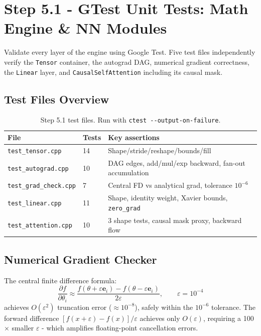 \documentclass[12pt, a4paper]{article}
\begin{document}
\section{Step 5.1 - GTest Unit Tests: Math Engine \& NN Modules}

\begin{tcolorbox}[designbox, title={Step 5.1 Goal}]
  Validate every layer of the engine using Google Test.  Five test files
  independently verify the \texttt{Tensor} container, the autograd DAG,
  numerical gradient correctness, the \texttt{Linear} layer, and
  \texttt{CausalSelfAttention} including its causal mask.
\end{tcolorbox}

\subsection{Test Files Overview}

\begin{table}[!ht]
\centering
\renewcommand{\arraystretch}{1.3}
\begin{tabular}{@{} l l p{10cm} @{}}
\toprule
\textbf{File} & \textbf{Tests} & \textbf{Key assertions} \\
\midrule
\texttt{test\_tensor.cpp}    & 14 & Shape/stride/reshape/bounds/fill \\
\texttt{test\_autograd.cpp}  & 10 & DAG edges, add/mul/exp backward, fan-out accumulation \\
\texttt{test\_grad\_check.cpp} & 7 & Central FD vs analytical grad, tolerance $10^{-6}$ \\
\texttt{test\_linear.cpp}    & 11 & Shape, identity weight, Xavier bounds, \texttt{zero\_grad} \\
\texttt{test\_attention.cpp} & 10 & 3 shape tests, causal mask proxy, backward flow \\
\bottomrule
\end{tabular}
\caption{Step 5.1 test files. Run with \texttt{ctest -{}-output-on-failure}.}
\end{table}

\subsection{Numerical Gradient Checker}

The central finite difference formula:
\[
  \frac{\partial f}{\partial \theta_i}
  \approx \frac{f(\theta + \varepsilon \mathbf{e}_i) - f(\theta - \varepsilon \mathbf{e}_i)}{2\varepsilon},
  \qquad \varepsilon = 10^{-4}
\]
achieves $O(\varepsilon^2)$ truncation error ($\approx 10^{-8}$), safely within the
$10^{-6}$ tolerance.  The forward difference $[f(x+\varepsilon)-f(x)]/\varepsilon$
achieves only $O(\varepsilon)$, requiring a 100$\times$ smaller $\varepsilon$ - which
amplifies floating-point cancellation errors.
\end{document}
